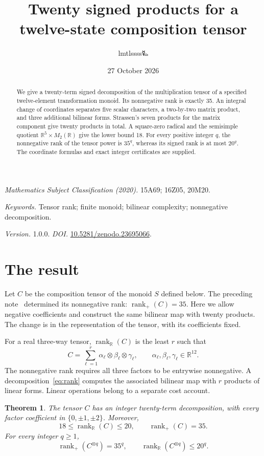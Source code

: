 \documentclass[11pt,a4paper]{article}
\title{\LARGE Twenty signed products for a\protect\\twelve-state composition tensor}
\author{lmtlssss{\authorsymbol 🜐}}
\date{27 October 2026}
\newtheorem{theorem}{Theorem}
\newcommand{\R}{\mathbb R}\newcommand{\Q}{\mathbb Q}
\newcommand{\rkplus}{\operatorname{rank}_{+}}
\newcommand{\rkreal}{\operatorname{rank}_{\R}}
\begin{document}
\maketitle\thispagestyle{plain}
\begin{abstract}
We give a twenty-term signed decomposition of the multiplication tensor of a
specified twelve-element transformation monoid. Its nonnegative rank is
exactly 35. An integral change of coordinates separates five scalar
characters, a two-by-two matrix product, and three additional bilinear
forms. Strassen's seven products for the matrix component give twenty
products in total. A square-zero radical and the semisimple quotient
$\R^5\times M_2(\R)$ give the lower bound 18. For every positive integer
$q$, the nonnegative rank of the tensor power is $35^q$, whereas its
signed rank is at most $20^q$. The coordinate formulas and exact
integer certificates are supplied.
\end{abstract}
\noindent\textit{Mathematics Subject Classification (2020).}
15A69; 16Z05, 20M20.\par
\noindent\textit{Keywords.} Tensor rank; finite monoid; bilinear complexity;
nonnegative decomposition.\par
\noindent\textit{Version.} 1.0.0.\quad
\textit{DOI.} \href{https://doi.org/10.5281/zenodo.23695066}{10.5281/zenodo.23695066}.

\section{The result}

Let $C$ be the composition tensor of the monoid $S$ defined below.
The preceding note~\cite{positive} determined its nonnegative rank:
$\rkplus(C)=35$. Here we allow negative coefficients and construct the
same bilinear map with twenty products. The change is in the
representation of the tensor, with its coefficients fixed.

For a real three-way tensor, $\rkreal(C)$ is the least $r$ such that
\begin{equation}\label{eq:rank}
 C=\sum_{\ell=1}^{r}\alpha_\ell\otimes\beta_\ell\otimes\gamma_\ell,
 \qquad \alpha_\ell,\beta_\ell,\gamma_\ell\in\R^{12}.
\end{equation}
The nonnegative rank requires all three factors to be entrywise
nonnegative. A decomposition~\eqref{eq:rank} computes the associated
bilinear map with $r$ products of linear forms. Linear operations belong
to a separate cost account.

\begin{theorem}\label{thm:main}
The tensor $C$ has an integer twenty-term decomposition, with every
factor coefficient in $\{0,\pm1,\pm2\}$. Moreover,
\begin{equation}\label{eq:bounds}
 18\leq\rkreal(C)\leq20,\qquad \rkplus(C)=35.
\end{equation}
For every integer $q\geq1$,
\begin{equation}\label{eq:power}
 \rkplus(C^{\otimes q})=35^q,
 \qquad \rkreal(C^{\otimes q})\leq20^q.
\end{equation}
\end{theorem}
\end{document}
